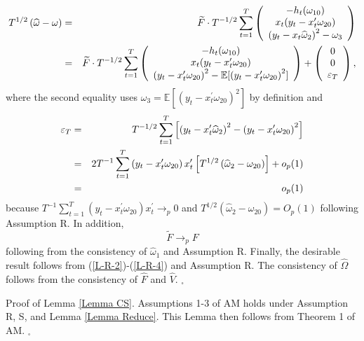 \documentclass[11pt]{article}
\begin{document}
\begin{eqnarray}
T^{1/2}\left( \widehat{\omega }-\omega \right)  &=&\widetilde{F}\cdot
T^{-1/2}\sum_{t=1}^{T}\left( 
\begin{array}{c}
-h_{t}(\omega _{10}) \\ 
x_{t}(y_{t}-x_{t}^{\prime }\omega _{20}) \\ 
\left( y_{t}-x_{t}\widehat{\omega }_{2}\right) ^{2}-\omega _{3}%
\end{array}%
\right)   \notag \\
&=&\widetilde{F}\cdot T^{-1/2}\sum_{t=1}^{T}\left( 
\begin{array}{c}
-h_{t}(\omega _{10}) \\ 
x_{t}(y_{t}-x_{t}^{\prime }\omega _{20}) \\ 
\left( y_{t}-x_{t}^{\prime }\omega _{20}\right) ^{2}-\mathbb{E}[\left(
y_{t}-x_{t}^{\prime }\omega _{20}\right) ^{2}]%
\end{array}%
\right) +\left( 
\begin{array}{c}
0 \\ 
0 \\ 
\varepsilon _{T}%
\end{array}%
\right) ,  \label{L-R-2}
\end{eqnarray}%
where the second equality uses $\omega _{3}=\mathbb{E}[\left(
y_{t}-x_{t}^{\prime }\omega _{20}\right) ^{2}]$ by definition and 
\begin{eqnarray}
\varepsilon _{T} &=&T^{-1/2}\sum_{t=1}^{T}\left[ \left( y_{t}-x_{t}^{\prime }%
\widehat{\omega }_{2}\right) ^{2}-\left( y_{t}-x_{t}^{\prime }\omega
_{20}\right) ^{2}\right]   \notag \\
&=&2T^{-1}\sum_{t=1}^{T}\left( y_{t}-x_{t}^{\prime }\omega _{20}\right)
x_{t}^{\prime }\left[ T^{1/2}\left( \widehat{\omega }_{2}-\omega
_{20}\right) \right] +o_{p}(1)  \notag \\
&=&o_{p}(1)  \label{L-R-3}
\end{eqnarray}%
because $T^{-1}\sum_{t=1}^{T}\left( y_{t}-x_{t}^{\prime }\omega _{20}\right)
x_{t}^{\prime }\rightarrow _{p}0$ and $T^{1/2}(\widehat{\omega }_{2}-\omega
_{20})=O_{p}(1)$ following Assumption R. In addition, 
\begin{equation}
\widetilde{F}\rightarrow _{p}F  \label{L-R-4}
\end{equation}%
following from the consistency of $\widehat{\omega }_{1}$ and Assumption R.
Finally, the desirable result follows from (\ref{L-R-2})-(\ref{L-R-4}) and
Assumption R. The consistency of $\widehat{\Omega }$ follows from the
consistency of $\widehat{F}$ and $\widehat{V}.$ $_{\square }$

\bigskip 

\noindent Proof of Lemma \ref{Lemma CS}. Assumptions 1-3 of AM holds under
Assumption R, S, and Lemma \ref{Lemma Reduce}. This Lemma then follows from
Theorem 1 of AM. $_{\square }$
\end{document}
